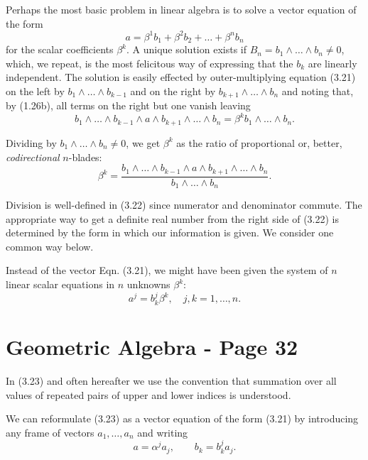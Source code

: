 \documentclass[fleqn]{scrartcl}
\numberwithin{equation}{section}
\begin{document}
\vspace{1em}
\noindent Perhaps the most basic problem in linear algebra is to solve a vector equation of the form
\begin{equation}
a = \beta^1 b_1 + \beta^2 b_2 + \dots + \beta^n b_n \tag{3.21}
\end{equation}
for the scalar coefficients \(\beta^k\). A unique solution exists if \(B_n = b_1 \wedge \dots \wedge b_n \neq 0\), which, we repeat, is the most felicitous way of expressing that the \(b_k\) are linearly independent. The solution is easily effected by outer-multiplying equation (3.21) on the left by \(b_1 \wedge \dots \wedge b_{k-1}\) and on the right by \(b_{k+1} \wedge \dots \wedge b_n\) and noting that, by (1.26b), all terms on the right but one vanish leaving
\[
b_1 \wedge \dots \wedge b_{k-1} \wedge a \wedge b_{k+1} \wedge \dots \wedge b_n = \beta^k b_1 \wedge \dots \wedge b_n.
\]

\noindent Dividing by \(b_1 \wedge \dots \wedge b_n \neq 0\), we get \(\beta^k\) as the ratio of proportional or, better, \textit{codirectional} \(n\)-blades:
\begin{equation}
\beta^k = \frac{b_1 \wedge \dots \wedge b_{k-1} \wedge a \wedge b_{k+1} \wedge \dots \wedge b_n}{b_1 \wedge \dots \wedge b_n}. \tag{3.22}
\end{equation}

\noindent Division is well-defined in (3.22) since numerator and denominator commute. The appropriate way to get a definite real number from the right side of (3.22) is determined by the form in which our information is given. We consider one common way below.

\vspace{1em}
\noindent Instead of the vector Eqn. (3.21), we might have been given the system of \(n\) linear scalar equations in \(n\) unknowns \(\beta^k\):
\begin{equation}
a^j = b_k^j \beta^k, \quad j, k = 1, \dots, n. \tag{3.23}
\end{equation}

\section*{Geometric Algebra - Page 32}

\noindent In (3.23) and often hereafter we use the convention that summation over all values of repeated pairs of upper and lower indices is understood.

\vspace{1em}
\noindent We can reformulate (3.23) as a vector equation of the form (3.21) by introducing any frame of vectors \(a_1, \dots, a_n\) and writing
\begin{equation}
a = \alpha^j a_j, \qquad b_k = b_k^j a_j. \tag{3.24}
\end{equation}
\end{document}
